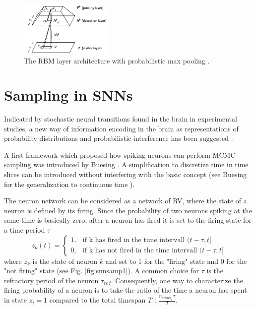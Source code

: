 \begin{figure}
	\centering
    	\includegraphics[width=0.4\textwidth]{imgs/prob_max_pool.png} 
    \caption{The RBM layer architecture with probabilistic max pooling \cite{lee2009convolutional}.}
	\label{fig:probmaxpool}
\end{figure}


\section{Sampling in SNNs} \label{c:snnsampling}

Indicated by stochastic neural transitions found in the brain in experimental studies, a new way of information encoding in the brain as representations of probability distributions and probabilistic interference has been suggested \cite{lee2003hierarchical}\cite{yang2007probabilistic}\cite{griffiths2008bayesian}.


A first framework which proposed how spiking neurons can perform MCMC sampling was introduced by Buesing \cite{Buesing2011}.
A simplification to discretize time in time slices can be introduced without interfering with the basic concept (see Buesing for the generalization to continuous time \cite{Buesing2011}).

The neuron network can be considered as a network of RV, where the state of a neuron is defined by its firing. 
Since the probability of two neurons spiking at the same time is basically zero, after a neuron has fired it is set to the firing state for a time period $\tau$
\[
z_k(t) = 
\begin{cases}
1, &  \text{if k has fired in the time intervall } (t - \tau , t ] \\
0, &  \text{if k has not fired in the time intervall } (t - \tau , t ] 
\end{cases}
\] 
where $z_k$ is the state of neuron $k$ and set to $1$ for the "firing" state and $0$ for the "not firing" state (see Fig. \ref{fig:snnsamp1}). 
A common choice for $\tau$ is the refractory period of the neuron $\tau_{ref}$.
Consequently, one way to characterize the firing probability of a neuron is to take the ratio of the time a neuron has spent in state $z_i=1$ compared to the total timespan $T$ : $\frac{n_{\text{spikes}_i} \, \tau}{ T }$.

